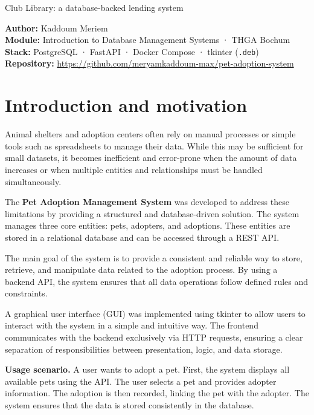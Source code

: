 \documentclass[11pt,a4paper]{article}
\begin{document}
\thispagestyle{empty}
%
{Club Library: a database-backed lending system}

\begin{infobox}
\textbf{Author:} Kaddoum Meriem \\
\textbf{Module:} Introduction to Database Management Systems · THGA Bochum \\
\textbf{Stack:} PostgreSQL · FastAPI · Docker Compose · tkinter (\texttt{.deb}) \\
\textbf{Repository:} \url{https://github.com/meryamkaddoum-max/pet-adoption-system}
\end{infobox}

\tableofcontents
\vspace{1em}

\section{Introduction and motivation}


Animal shelters and adoption centers often rely on manual processes or simple tools
such as spreadsheets to manage their data. While this may be sufficient for small
datasets, it becomes inefficient and error-prone when the amount of data increases
or when multiple entities and relationships must be handled simultaneously.

The \textbf{Pet Adoption Management System} was developed to address these limitations
by providing a structured and database-driven solution. The system manages three
core entities: pets, adopters, and adoptions. These entities are stored in a relational
database and can be accessed through a REST API.

The main goal of the system is to provide a consistent and reliable way to store,
retrieve, and manipulate data related to the adoption process. By using a backend
API, the system ensures that all data operations follow defined rules and constraints.

A graphical user interface (GUI) was implemented using tkinter to allow users to
interact with the system in a simple and intuitive way. The frontend communicates
with the backend exclusively via HTTP requests, ensuring a clear separation of
responsibilities between presentation, logic, and data storage.

\begin{beispielbox}
\textbf{Usage scenario.}
A user wants to adopt a pet. First, the system displays all available pets using the
API. The user selects a pet and provides adopter information. The adoption is then
recorded, linking the pet with the adopter. The system ensures that the data is
stored consistently in the database.
\end{beispielbox}
\end{document}
